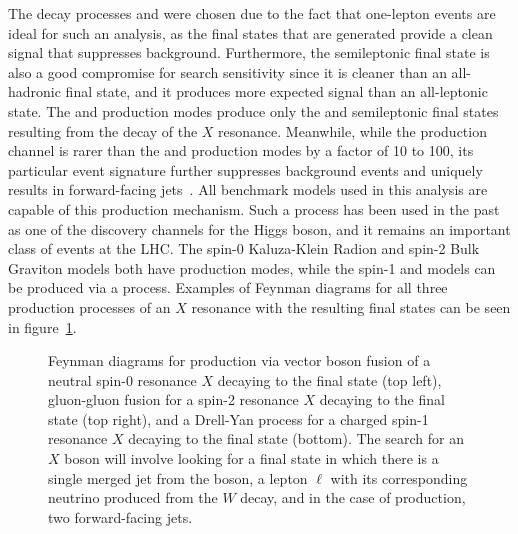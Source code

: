 The decay processes \XtoWVtolnuqqbarpr and \XtoWHtolnubbbar were chosen due to the fact that one-lepton events are ideal for such an analysis, as the final states that are generated provide a clean signal that suppresses background.
Furthermore, the semileptonic final state is also a good compromise for search sensitivity since it is cleaner than an all-hadronic final state, and it produces more expected signal than an all-leptonic state.
The \ggF and \DY production modes produce only the \lnuqqbarprp and \lnubbbar semileptonic final states resulting from the decay of the $X$ resonance.
Meanwhile, while the \VBF production channel is rarer than the \ggF and \DY production modes by a factor of 10 to 100, its particular event signature further suppresses background events and uniquely results in forward-facing jets~\cite{rauch2016vectorboson}.
All benchmark models used in this analysis are capable of this production mechanism.
Such a process has been used in the past as one of the discovery channels for the Higgs boson, and it remains an important class of events at the LHC.
The spin-0 Kaluza-Klein Radion and spin-2 Bulk Graviton models both have \ggF production modes, while the spin-1 \Wpr and \Zpr models can be produced via a \DY process.
Examples of Feynman diagrams for all three production processes of an $X$ resonance with the resulting final states can be seen in figure~\ref{fig:productFeynman}.

\begin{figure}[htbp]
  \centering
  
  \caption{
    Feynman diagrams for production via vector boson fusion of a neutral spin-0 resonance $X$ decaying to the final state \lnuqqbarpr (top left), gluon-gluon fusion for a spin-2 resonance $X$ decaying to the final state \lnuqqbarpr (top right), and a Drell-Yan process for a charged spin-1 resonance $X$ decaying to the final state \lnubbbar (bottom).
    The search for an $X$ boson will involve looking for a final state in which there is a single merged jet from the \VorH boson, a lepton $\ell$ with its corresponding neutrino produced from the $W$ decay, and in the case of \VBF production, two forward-facing jets.
  }
  \label{fig:productFeynman}
\end{figure}


